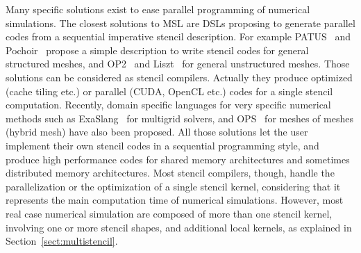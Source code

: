 
Many specific solutions exist to ease parallel programming of numerical simulations. %
The closest solutions to MSL are DSLs proposing to generate parallel codes from a sequential imperative stencil description. For example PATUS~\cite{citeulike12258902} and Pochoir~\cite{spaaTangCKLL11} propose a simple description to write stencil codes for general structured meshes, and OP2~\cite{Giles2011} and Liszt~\cite{DeVito2011LDS} for general unstructured meshes. Those solutions can be considered as stencil compilers. Actually they produce optimized (cache tiling etc.) or parallel (CUDA, OpenCL etc.) codes for a single stencil computation.
Recently, domain specific languages for very specific numerical methods such as ExaSlang~\cite{Schmitt:2014:EDL:2691166.2691171} for multigrid solvers, and OPS~\cite{Reguly:2014:ODS:2691166.2691173} for meshes of meshes (hybrid mesh) have also been proposed. 
All those solutions let the user implement their own stencil codes in a sequential programming style, and produce high performance codes for shared memory architectures and sometimes distributed memory architectures. 
Most stencil compilers, though, handle the parallelization or the optimization of a single stencil kernel, considering that it represents the main computation time of numerical simulations. However, most real case numerical simulation are composed of more than one stencil kernel, involving one or more stencil shapes, and additional local kernels, as explained in Section~\ref{sect:multistencil}.

